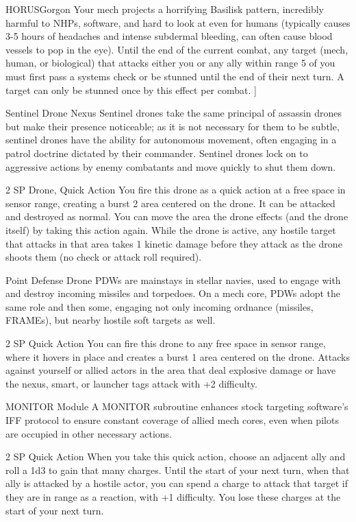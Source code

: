 \begin{mech}{HORUS}{Gorgon}
{Your mech projects a horrifying Basilisk pattern, incredibly harmful to NHPs, software, and hard to look at even for humans (typically causes 3-5 hours of headaches and intense subdermal bleeding, can often cause blood vessels to pop in the eye). Until the end of the current combat, any target (mech, human, or biological) that attacks either you or any ally within range 5 of you must first pass a systems check or be stunned until the end of their next turn. A target can only be stunned once by this effect per combat.
}]


Sentinel Drone Nexus
Sentinel drones take the same principal of assassin drones but make their presence noticeable; as it is not necessary for them to be subtle, sentinel drones have the ability for autonomous movement, often engaging in a patrol doctrine dictated by their commander. Sentinel drones lock on to aggressive actions by enemy combatants and move quickly to shut them down.

2 SP
Drone, Quick Action
You fire this drone as a quick action at a free space in sensor range, creating a burst 2 area centered on the drone. It can be attacked and destroyed as normal. You can move the area the drone effects (and the drone itself) by taking this action again. While the drone is active, any hostile target that attacks in that area takes 1 kinetic damage before they attack as the drone shoots them (no check or attack roll required).

Point Defense Drone
PDWs are mainstays in stellar navies, used to engage with and destroy incoming missiles and torpedoes. On a mech core, PDWs adopt the same role and then some, engaging not only incoming ordnance (missiles, FRAMEs), but nearby hostile soft targets as well.

2 SP
Quick Action
You can fire this drone to any free space in sensor range, where it hovers in place and creates a burst 1 area centered on the drone. Attacks against yourself or allied actors in the area that deal explosive damage or have the nexus, smart, or launcher tags attack with +2 difficulty.

MONITOR Module
A MONITOR subroutine enhances stock targeting software’s IFF protocol to ensure constant coverage of allied mech cores, even when pilots are occupied in other necessary actions.

2 SP
Quick Action
When you take this quick action, choose an adjacent ally and roll a 1d3 to gain that many charges. Until the start of your next turn, when that ally is attacked by a hostile actor, you can spend a charge to attack that target if they are in range as a reaction, with +1 difficulty. You lose these charges at the start of your next turn.


\end{mech}
